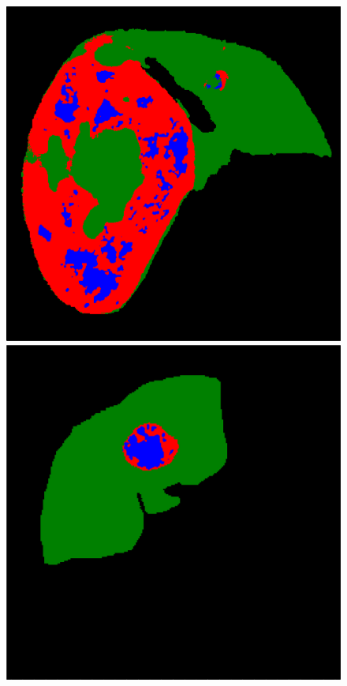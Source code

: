 \begin{figure}[!ht]
\begin{minipage}{4cm}
\end{minipage} \hspace{-0.3cm}
\begin{minipage}{4cm}
\includegraphics[width=\linewidth]{../SemanticSeg/images/5_8_FullDMP_resized}
\end{minipage} 
\vspace{-0.2cm}
\begin{minipage}{4cm}
\includegraphics[width=\linewidth]{../SemanticSeg/images/1_21_Cascade_resized}

\end{minipage}
\end{figure}
